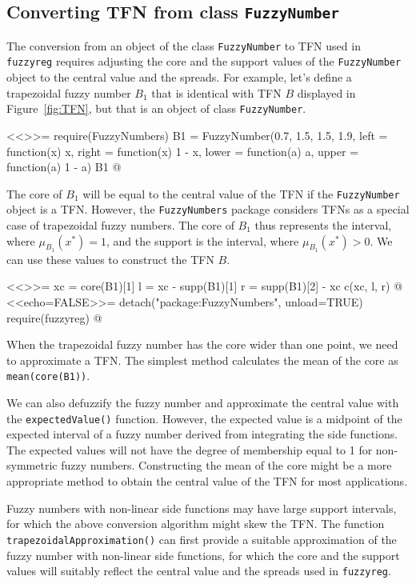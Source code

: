 \documentclass[a4paper]{article}
\begin{document}
\subsection{Converting TFN from class \texttt{FuzzyNumber}}

The conversion from an object of the class \texttt{FuzzyNumber} to TFN used in
\texttt{fuzzyreg} requires adjusting the core and the support values of the \texttt{FuzzyNumber}
object to the central value and the spreads. For example, let's define a
trapezoidal fuzzy number $B_1$
that is identical with TFN $B$ displayed in Figure~\ref{fig:TFN}, but that is an object of
class \texttt{FuzzyNumber}.

<<>>=
require(FuzzyNumbers)
B1 = FuzzyNumber(0.7, 1.5, 1.5, 1.9,
		left = function(x) x,
		right = function(x) 1 - x,
		lower = function(a) a,
		upper = function(a) 1 - a)
B1
@

The core of $B_1$ will be equal to the central value of the TFN if the \texttt{FuzzyNumber} object is a
TFN. However, the \texttt{FuzzyNumbers} package considers TFNs as a special case of trapezoidal
fuzzy numbers. The core of $B_1$ thus represents the interval, where $\mu_{B_1}(x^*)=1$, and
the support is the interval, where $\mu_{B_1}(x^*)>0$. We can use these values to construct
the TFN $B$.

<<>>=
xc = core(B1)[1]
l = xc - supp(B1)[1]
r = supp(B1)[2] - xc
c(xc, l, r)
@
<<echo=FALSE>>=
detach("package:FuzzyNumbers", unload=TRUE)
require(fuzzyreg)
@

When the trapezoidal fuzzy number has the core wider than one point, we need to approximate 
a TFN. The simplest method calculates the mean of the core as
\texttt{mean(core(B1))}.

We can also defuzzify the fuzzy number and approximate
the central value with the \texttt{expectedValue()} function. However, the expected value is a
midpoint of the expected interval of a fuzzy number derived from integrating the side functions.
The expected values will not have the degree of membership equal to 1 for non-symmetric
fuzzy numbers. Constructing the mean of the core might be a more appropriate method to
obtain the central value of the TFN for most applications.

Fuzzy numbers with non-linear side functions may have large support intervals, for which
the above conversion algorithm might skew the TFN. The function
\texttt{trapezoidalApproximation()} can first provide a suitable approximation of the
fuzzy number with non-linear side functions, for which the core and the support values
will suitably reflect the central value and the spreads used in \texttt{fuzzyreg}.
\end{document}

